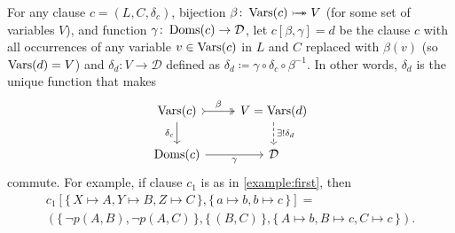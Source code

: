 For any clause $c = (L, C, \delta_c)$, bijection $\beta\colon \operatorname{Vars}(c) \mathrel{\rightarrowtail\kern-1.9ex\twoheadrightarrow} V$ (for some set of variables $V$), and function $\gamma\colon \operatorname{Doms}(c) \to \mathcal{D}$, let $c[\beta, \gamma] = d$ be the clause $c$ with all occurrences of any variable $v \in \operatorname{Vars}(c)$ in $L$ and $C$ replaced with $\beta(v)$ (so $\operatorname{Vars}(d) = V$) and $\delta_d\colon V \to \mathcal{D}$ defined as $\delta_d \coloneqq \gamma \circ \delta_c \circ \beta^{-1}$. In other words, $\delta_d$ is the unique function that makes
\[
\begin{tikzcd}
  \Vars(c) \ar[r, tail, two heads, "\beta"] \arrow[d, swap, "\delta_c"] & V = \Vars(d) \ar[d, dashed, "\exists!\delta_d"] \\
  \Doms(c) \ar[r, swap, "\gamma"] & \mathcal{D}
\end{tikzcd}
\]
commute. For example, if clause $c_1$ is as in \cref{example:first}, then
\begin{multline*}
  c_1[\{\, X \mapsto A, Y \mapsto B, Z \mapsto C \,\}, \{\, a \mapsto b, b \mapsto c \,\}] = \\
  (\{\, \neg p(A, B), \neg p(A, C) \,\}, \{\, (B, C) \,\}, \{\, A \mapsto b, B \mapsto c, C \mapsto c \,\}).
\end{multline*}



